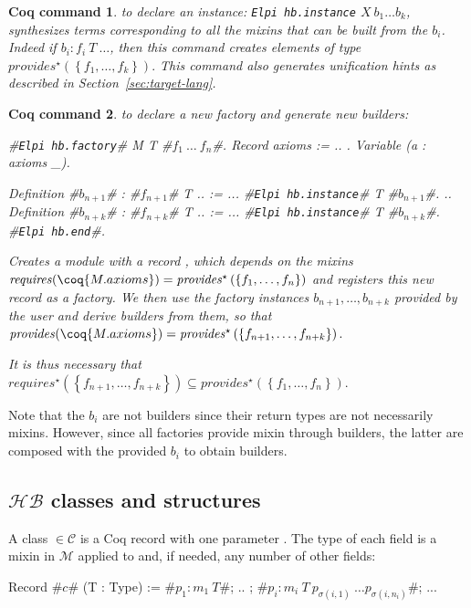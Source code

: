 \documentclass[a4paper,UKenglish,cleveref, autoref]{lipics-v2019}
\newcommand{\HB}{\ensuremath{\mathcal{HB}}}
\newcommand{\mixin}{mixin}
\newcommand{\mixins}{mixins}
\newcommand{\M}{\ensuremath{\mathcal{M}}}
\newcommand{\factory}{factory}
\newcommand{\factories}{factories}
\newcommand{\mixinbuilders}{builders}
\newcommand{\factoryinstances}{factory instances}
\newcommand{\C}{\ensuremath{\mathcal{C}}}
\newcommand{\class}{class}
\newcommand{\requires}{\ensuremath{\mathit{requires}}}
\newcommand{\provides}{\ensuremath{\mathit{provides}}}
\newcommand{\set}[1]{\left\{#1\right\}}
\newcommand{\enum}[2]{\ensuremath{\set{#1,\ldots,#2}}}
\newcommand{\hbfactory}{{\tt\color{dkgreen}Elpi hb.factory}}
\newcommand{\hbinstance}{{\tt\color{dkgreen}Elpi hb.instance}}
\newcommand{\hbend}{{\tt\color{dkgreen}Elpi hb.end}}
\theoremstyle{implem}
\theoremstyle{implem}
\theoremstyle{command}
\newtheorem*{command}{Coq command}
\begin{document}
\begin{command} to declare an instance: \hbinstance{}
  \(X\ b_1 \ldots b_k\), synthesizes terms corresponding to all the
  \mixins{} that can be built from the $b_i$. Indeed if
  \(b_i : f_i\ T\ \ldots\), then this command creates elements of type
  \(\provides{}^\star\left(\enum{f_1}{f_k}\right).\) This command also
  generates unification hints as described in
  Section~\ref{sec:target-lang}.
\end{command}

\begin{command} to declare a new \factory{} and generate new \mixinbuilders:
\begin{coqcode}
#\hbfactory{}# M T #$f_1\ \ldots\ f_n$#.
  Record axioms := { .. }.
  Variable (a : axioms _).

  Definition #$b_{n+1}$# : #$f_{n+1}$# T .. := ...
  #\hbinstance{}# T #$b_{n+1}$#.
  ..
  Definition #$b_{n+k}$# : #$f_{n+k}$# T .. := ...
  #\hbinstance{}# T #$b_{n+k}$#.
#\hbend{}#.
\end{coqcode}
  Creates a module  with a record
  , which depends on the mixins
  \(\requires{}(\coq{M.axioms}) =
  \provides{}^\star\left(\enum{f_1}{f_n}\right)\) and registers this
  new record as a factory. We then use the \factoryinstances{}
  \(b_{n+1}, \ldots, b_{n+k}\) provided by the user and derive
  \mixinbuilders{} from them, so that
  \(\provides{}(\coq{M.axioms}) = \provides{}^\star\left(\enum{f_{n+1}}{f_{n+k}}\right).\)

  It is thus necessary that
  \(\requires{}^\star\left(\enum{f_{n+1}}{f_{n+k}}\right) \subseteq
  \provides{}^\star\left(\enum{f_1}{f_n}\right).\)
\end{command}

Note that the \(b_i\) are not \mixinbuilders{} since their return types
are not necessarily \mixins{}. However, since all \factories{} provide
\mixin{} through \mixinbuilders{}, the latter are composed with the
provided \(b_i\) to obtain \mixinbuilders{}.

\subsection{\HB{} classes and structures}
\label{sec:hb-class-struct}


\begin{definition}[\C{}, class]
A \class{}  \(\in \C{}\) is a Coq record with one parameter
. The type of each field is a \mixin{} in \M{} applied to
 and, if needed, any number of other fields:
\begin{coqcode}
Record #$c$# (T : Type) := { #\(p_1 : m_1\ T\)#; .. ; #\(p_i : m_i\ T\ p_{\sigma(i,1)}\ \ldots p_{\sigma(i,n_i)}\)#; ..}.
\end{coqcode}
\end{definition}
\end{document}
